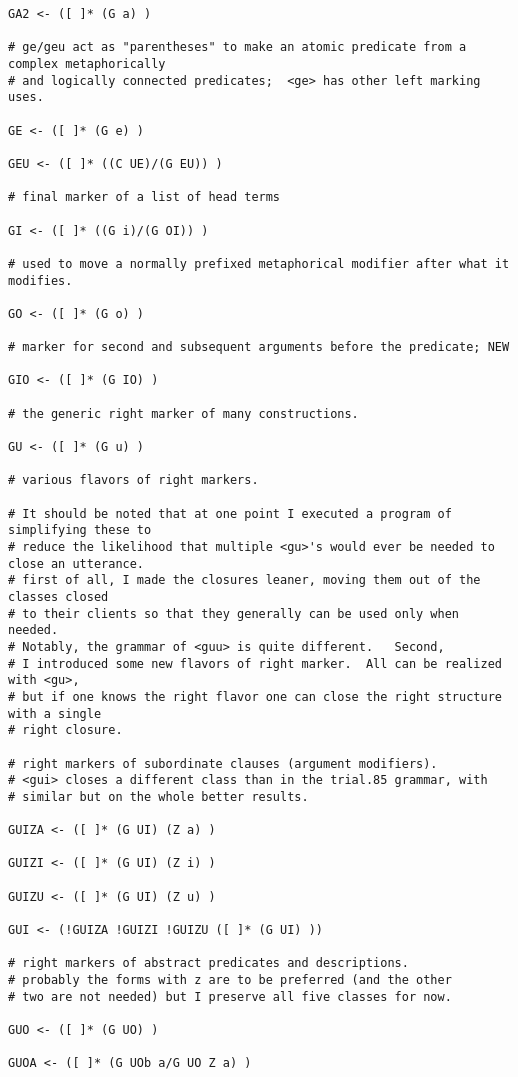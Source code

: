 \documentclass[12pt]{book}
\begin{document}
{\begin{verbatim}
GA2 <- ([ ]* (G a) )

# ge/geu act as "parentheses" to make an atomic predicate from a complex metaphorically
# and logically connected predicates;  <ge> has other left marking uses.

GE <- ([ ]* (G e) )

GEU <- ([ ]* ((C UE)/(G EU)) )

# final marker of a list of head terms

GI <- ([ ]* ((G i)/(G OI)) )

# used to move a normally prefixed metaphorical modifier after what it modifies.

GO <- ([ ]* (G o) )

# marker for second and subsequent arguments before the predicate; NEW

GIO <- ([ ]* (G IO) )

# the generic right marker of many constructions.

GU <- ([ ]* (G u) )

# various flavors of right markers.

# It should be noted that at one point I executed a program of simplifying these to
# reduce the likelihood that multiple <gu>'s would ever be needed to close an utterance.
# first of all, I made the closures leaner, moving them out of the classes closed
# to their clients so that they generally can be used only when needed. 
# Notably, the grammar of <guu> is quite different.   Second,
# I introduced some new flavors of right marker.  All can be realized with <gu>,
# but if one knows the right flavor one can close the right structure with a single
# right closure.

# right markers of subordinate clauses (argument modifiers).
# <gui> closes a different class than in the trial.85 grammar, with
# similar but on the whole better results.

GUIZA <- ([ ]* (G UI) (Z a) )

GUIZI <- ([ ]* (G UI) (Z i) )

GUIZU <- ([ ]* (G UI) (Z u) )

GUI <- (!GUIZA !GUIZI !GUIZU ([ ]* (G UI) ))

# right markers of abstract predicates and descriptions.
# probably the forms with z are to be preferred (and the other
# two are not needed) but I preserve all five classes for now. 

GUO <- ([ ]* (G UO) )

GUOA <- ([ ]* (G UOb a/G UO Z a) )


\end{verbatim}}
\end{document}

